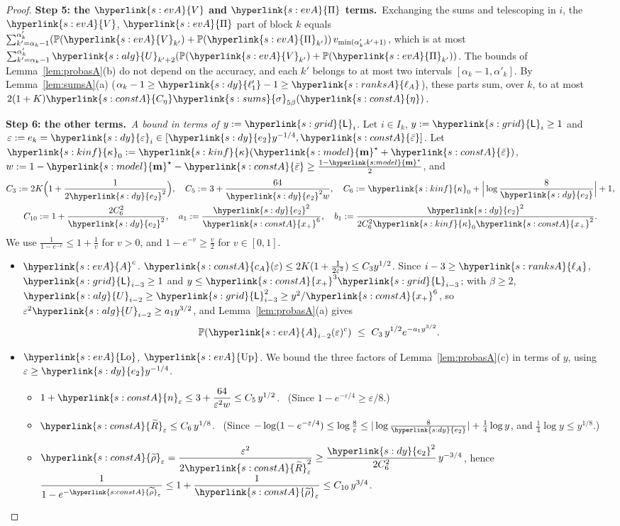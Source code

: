 \documentclass[10pt]{article}
\newcommand{\sy}[2]{{\hyperlink{#1}{#2}}}
\newcommand{\PP}{\mathbb{P}}
\newcommand{\1}{\mathbf{1}}
\newcommand{\m}{\sy{s:model}{\mathbf{m}}}
\newcommand{\kap}{\sy{s:kinf}{\kappa}}
\newcommand{\Lg}{\sy{s:grid}{\mathsf L}}
\newcommand{\Ug}{\sy{s:alg}{U}}
\newcommand{\eb}{\sy{s:constA}{\bar\varepsilon}}
\newcommand{\eg}{\sy{s:constA}{\eta}}
\newcommand{\Ceta}{\sy{s:constA}{C_\eta}}
\newcommand{\Rt}{\sy{s:constA}{\widetilde R}}
\newcommand{\rt}{\sy{s:constA}{\widetilde\rho}}
\newcommand{\ngr}{\sy{s:constA}{n}}
\newcommand{\cAc}{\sy{s:constA}{c_A}}
\newcommand{\xp}{\sy{s:constA}{x_+}}
\newcommand{\sig}{\sy{s:sums}{\sigma}}
\newcommand{\lA}{\sy{s:ranksA}{\ell_A}}
\newcommand{\Ag}{\sy{s:evA}{A}}
\newcommand{\Vg}{\sy{s:evA}{V}}
\newcommand{\Pig}{\sy{s:evA}{\Pi}}
\newcommand{\Lo}{\sy{s:evA}{\mathrm{Lo}}}
\newcommand{\Up}{\sy{s:evA}{\mathrm{Up}}}
\newcommand{\epl}{\sy{s:dy}{\varepsilon}}
\newcommand{\etwo}{\sy{s:dy}{e_2}}
\newcommand{\lonep}{\sy{s:dy}{\ell'_1}}
\newcommand{\stp}[2]{\par\medskip\noindent\textbf{Step #1: #2.}\ }
\begin{document}
\begin{proof}
\stp5{the $\Vg$ and $\Pig$ terms}Exchanging the sums and telescoping in $i$, the $\Vg$, $\Pig$ part of block $k$ equals
$\sum_{k'=\alpha_k-1}^{\alpha'_k}(\PP(\Vg_{k'})+\PP(\Pig_{k'}))\,v_{\min(\alpha'_k,k'+1)}$, which is at most $\sum_{k'=\alpha_k-1}^{\alpha'_k}\Ug_{k'+2}(\PP(\Vg_{k'})+\PP(\Pig_{k'}))$. The bounds
of Lemma~\ref{lem:probasA}(b) do not depend on the accuracy, and each $k'$ belongs to at most two intervals $[\alpha_k-1,\alpha'_k]$. By Lemma~\ref{lem:sumsA}(a)
($\alpha_k-1\ge\lonep-1\ge\lA$), these parts sum, over $k$, to at most $2(1+K)\Ceta\sig_{5\beta}(\eg)$.

\stp6{the other terms}\emph{A bound in terms of $y:=\Lg_i$.} Let $i\in I_k$, $y:=\Lg_i\ge1$ and $\varepsilon:=e_k=\epl_i\in[\etwo y^{-1/4},\eb]$. Let $\kap_0:=\kap(\m^\star+\eb)$,
$w:=1-\m^\star-\eb\ge\frac{1-\m^\star}2$, and
\begin{gather*}
C_3:=2K\Big(1+\frac1{2\etwo^2}\Big),\quad C_5:=3+\frac{64}{\etwo^2w},\quad C_6:=\kap_0+\Big|\log\frac8{\etwo}\Big|+1,\\
C_{10}:=1+\frac{2C_6^2}{\etwo^2},\quad a_1:=\frac{\etwo^2}{\xp^6},\quad b_1:=\frac{\etwo^2}{2C_6^2\kap_0\xp^2}.
\end{gather*}
We use $\frac1{1-e^{-v}}\le1+\frac1v$ for $v>0$, and $1-e^{-v}\ge\frac v2$ for $v\in[0,1]$.
\begin{itemize}
\item \emph{$\Ag^c$.} $\cAc(\varepsilon)\le2K(1+\frac1{2\varepsilon^2})\le C_3y^{1/2}$. Since $i-3\ge\lA$, $\Lg_{i-3}\ge1$ and $y\le\xp^3\Lg_{i-3}$; with $\beta\ge2$,
$\Ug_{i-2}\ge\Lg_{i-3}^2\ge y^2/\xp^6$, so $\varepsilon^2\Ug_{i-2}\ge a_1y^{3/2}$, and Lemma~\ref{lem:probasA}(a) gives
\[
\PP(\Ag_{i-2}(\varepsilon)^c)\ \le\ C_3\,y^{1/2}e^{-a_1y^{3/2}}.
\]
\item \emph{$\Lo$, $\Up$.} We bound the three factors of Lemma~\ref{lem:probasA}(c) in terms of $y$, using $\varepsilon\ge\etwo y^{-1/4}$.
\begin{itemize}
\item $1+\ngr_\varepsilon\le3+\dfrac{64}{\varepsilon^2w}\le C_5\,y^{1/2}$. \ (Since $1-e^{-\varepsilon/4}\ge\varepsilon/8$.)
\item $\Rt_\varepsilon\le C_6\,y^{1/8}$. \ (Since $-\log(1-e^{-\varepsilon/4})\le\log\frac8\varepsilon\le|\log\frac8{\etwo}|+\frac14\log y$, and $\frac14\log y\le y^{1/8}$.)
\item $\rt_\varepsilon=\dfrac{\varepsilon^2}{2\Rt_\varepsilon^2}\ge\dfrac{\etwo^2}{2C_6^2}\,y^{-3/4}$, hence $\dfrac1{1-e^{-\rt_\varepsilon}}\le1+\dfrac1{\rt_\varepsilon}\le C_{10}\,y^{3/4}$.

\end{itemize}
\end{itemize}
\end{proof}
\end{document}
